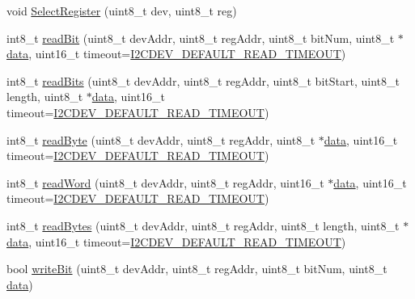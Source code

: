 \begin{DoxyCompactItemize}
void \mbox{\hyperlink{classI2Cdev_a3be31bf7d3f40bb215d8854aac945db3}{Select\+Register}} (uint8\+\_\+t dev, uint8\+\_\+t reg)
\item 
int8\+\_\+t \mbox{\hyperlink{classI2Cdev_ab028a4f330f4f31dc8af9890431a2a63}{read\+Bit}} (uint8\+\_\+t dev\+Addr, uint8\+\_\+t reg\+Addr, uint8\+\_\+t bit\+Num, uint8\+\_\+t $\ast$\mbox{\hyperlink{classperif_1_1PerifBase_a1a3afaa535fda17e9f97123fffe78765}{data}}, uint16\+\_\+t timeout=\mbox{\hyperlink{I2Cdev_8h_ad9726bb02451bb8f59d3d2729e4cd20e}{I2\+C\+D\+E\+V\+\_\+\+D\+E\+F\+A\+U\+L\+T\+\_\+\+R\+E\+A\+D\+\_\+\+T\+I\+M\+E\+O\+UT}})
\item 
int8\+\_\+t \mbox{\hyperlink{classI2Cdev_a362d1d9bf44d01f0dfd7db94df8a61e5}{read\+Bits}} (uint8\+\_\+t dev\+Addr, uint8\+\_\+t reg\+Addr, uint8\+\_\+t bit\+Start, uint8\+\_\+t length, uint8\+\_\+t $\ast$\mbox{\hyperlink{classperif_1_1PerifBase_a1a3afaa535fda17e9f97123fffe78765}{data}}, uint16\+\_\+t timeout=\mbox{\hyperlink{I2Cdev_8h_ad9726bb02451bb8f59d3d2729e4cd20e}{I2\+C\+D\+E\+V\+\_\+\+D\+E\+F\+A\+U\+L\+T\+\_\+\+R\+E\+A\+D\+\_\+\+T\+I\+M\+E\+O\+UT}})
\item 
int8\+\_\+t \mbox{\hyperlink{classI2Cdev_a80bf7daa6a6c34df95de78ac54d01b1f}{read\+Byte}} (uint8\+\_\+t dev\+Addr, uint8\+\_\+t reg\+Addr, uint8\+\_\+t $\ast$\mbox{\hyperlink{classperif_1_1PerifBase_a1a3afaa535fda17e9f97123fffe78765}{data}}, uint16\+\_\+t timeout=\mbox{\hyperlink{I2Cdev_8h_ad9726bb02451bb8f59d3d2729e4cd20e}{I2\+C\+D\+E\+V\+\_\+\+D\+E\+F\+A\+U\+L\+T\+\_\+\+R\+E\+A\+D\+\_\+\+T\+I\+M\+E\+O\+UT}})
\item 
int8\+\_\+t \mbox{\hyperlink{classI2Cdev_af62cd3a62562c704c6f183ea7a42064d}{read\+Word}} (uint8\+\_\+t dev\+Addr, uint8\+\_\+t reg\+Addr, uint16\+\_\+t $\ast$\mbox{\hyperlink{classperif_1_1PerifBase_a1a3afaa535fda17e9f97123fffe78765}{data}}, uint16\+\_\+t timeout=\mbox{\hyperlink{I2Cdev_8h_ad9726bb02451bb8f59d3d2729e4cd20e}{I2\+C\+D\+E\+V\+\_\+\+D\+E\+F\+A\+U\+L\+T\+\_\+\+R\+E\+A\+D\+\_\+\+T\+I\+M\+E\+O\+UT}})
\item 
int8\+\_\+t \mbox{\hyperlink{classI2Cdev_ab1ba3954fcc16341aa6e04e0a569c0ea}{read\+Bytes}} (uint8\+\_\+t dev\+Addr, uint8\+\_\+t reg\+Addr, uint8\+\_\+t length, uint8\+\_\+t $\ast$\mbox{\hyperlink{classperif_1_1PerifBase_a1a3afaa535fda17e9f97123fffe78765}{data}}, uint16\+\_\+t timeout=\mbox{\hyperlink{I2Cdev_8h_ad9726bb02451bb8f59d3d2729e4cd20e}{I2\+C\+D\+E\+V\+\_\+\+D\+E\+F\+A\+U\+L\+T\+\_\+\+R\+E\+A\+D\+\_\+\+T\+I\+M\+E\+O\+UT}})
\item 
bool \mbox{\hyperlink{classI2Cdev_aa68890af87de5471d32e583ebbd91acb}{write\+Bit}} (uint8\+\_\+t dev\+Addr, uint8\+\_\+t reg\+Addr, uint8\+\_\+t bit\+Num, uint8\+\_\+t \mbox{\hyperlink{classperif_1_1PerifBase_a1a3afaa535fda17e9f97123fffe78765}{data}})

\end{DoxyCompactItemize}

